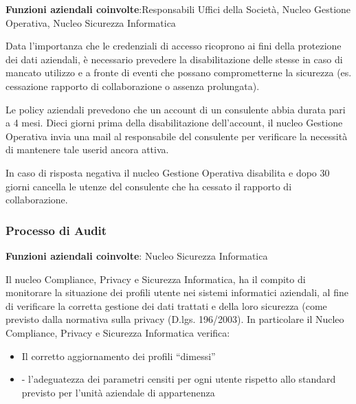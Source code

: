\textbf{Funzioni aziendali coinvolte}:Responsabili
Uffici della Societ\`a, Nucleo Gestione Operativa, Nucleo Sicurezza
Informatica


Data l'importanza che le credenziali di accesso
ricoprono ai fini della protezione dei dati aziendali, \`e necessario
prevedere la disabilitazione delle stesse in caso di mancato utilizzo e
a fronte di eventi che possano comprometterne la sicurezza (es.
cessazione rapporto di collaborazione o assenza prolungata).

Le policy aziendali prevedono che un account di un consulente abbia
durata pari a 4 mesi.
Dieci giorni prima della disabilitazione dell'account,
il nucleo Gestione Operativa invia una mail al responsabile del
consulente per verificare la necessit\`a di mantenere tale userid
ancora attiva.

In caso di risposta negativa il nucleo Gestione Operativa disabilita e
dopo 30 giorni cancella le utenze del consulente che ha cessato il
rapporto di collaborazione.


\subsubsection{Processo di Audit}
\textbf{Funzioni aziendali coinvolte}: Nucleo Sicurezza Informatica 

Il nucleo Compliance, Privacy e Sicurezza Informatica, ha il compito di
monitorare la situazione dei profili utente nei sistemi informatici aziendali,
al fine di verificare la corretta gestione dei dati trattati e della loro
sicurezza (come previsto dalla normativa sulla privacy (D.lgs. 196/2003). 
In particolare il Nucleo Compliance, Privacy e Sicurezza Informatica verifica:
\begin{itemize}
\item Il corretto aggiornamento dei profili ``dimessi''
\item -	l'adeguatezza dei parametri censiti per ogni utente rispetto allo
standard previsto per l'unità aziendale di appartenenza
\end{itemize}

